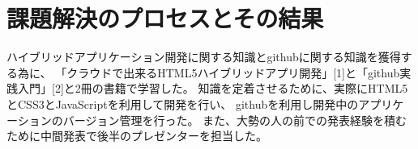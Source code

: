 \section{課題解決のプロセスとその結果}
ハイブリッドアプリケーション開発に関する知識とgithubに関する知識を獲得する為に、
「クラウドで出来るHTML5ハイブリッドアプリ開発」[1]と「github実践入門」[2]と2冊の書籍で学習した。
知識を定着させるために、実際にHTML5とCSS3とJavaScriptを利用して開発を行い、
githubを利用し開発中のアプリケーションのバージョン管理を行った。
また、大勢の人の前での発表経験を積むために中間発表で後半のプレゼンターを担当した。
